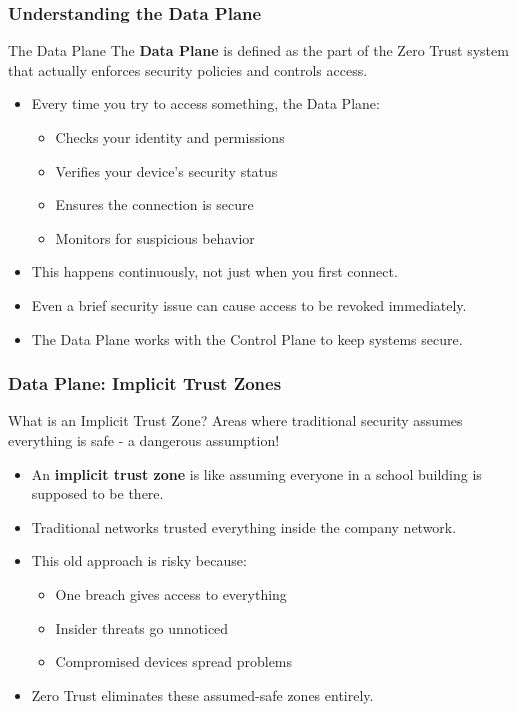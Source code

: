 \documentclass{beamer}
\begin{document}
\begin{frame}
    \frametitle{Understanding the Data Plane}

    \begin{block}{The Data Plane}
        The \textbf{Data Plane} is defined as the part of the Zero Trust system that actually enforces security policies and controls access.
    \end{block}

    \begin{itemize}
        \item Every time you try to access something, the Data Plane:
            \begin{itemize}
                \item Checks your identity and permissions
                \item Verifies your device's security status
                \item Ensures the connection is secure
                \item Monitors for suspicious behavior
            \end{itemize}
        \item This happens continuously, not just when you first connect.
        \item Even a brief security issue can cause access to be revoked immediately.
        \item The Data Plane works with the Control Plane to keep systems secure.
    \end{itemize}
\end{frame}

\begin{frame}
    \frametitle{Data Plane: Implicit Trust Zones}
    \begin{block}{What is an Implicit Trust Zone?}
        Areas where traditional security assumes everything is safe - a dangerous assumption!
    \end{block}
    \begin{itemize}
        \item An \textbf{implicit trust zone} is like assuming everyone in a school building is supposed to be there.
        \item Traditional networks trusted everything inside the company network.
        \item This old approach is risky because:
            \begin{itemize}
                \item One breach gives access to everything
                \item Insider threats go unnoticed
                \item Compromised devices spread problems
            \end{itemize}
        \item Zero Trust eliminates these assumed-safe zones entirely.
    \end{itemize}
\end{frame}
\end{document}
